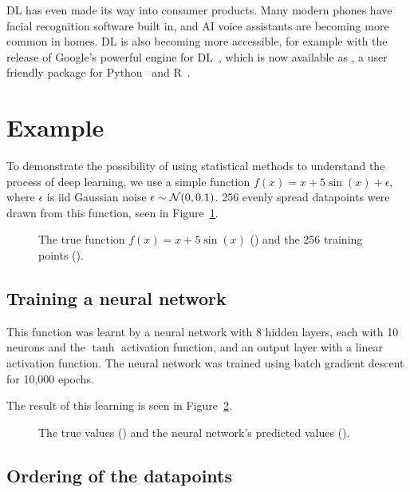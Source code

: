 \ac{DL} has even made its way into consumer products.
Many modern phones have facial recognition software built in, and \ac{AI} voice assistants are becoming more common in homes.
\ac{DL} is also becoming more accessible, for example with the release of Google's powerful  engine for \ac{DL}~\autocite{abadi2016}, which is now available as , a user friendly package for Python~\autocite{chollet2015} and R~\autocite{allaire2018}.

\section{Example}

To demonstrate the possibility of using statistical methods to understand the process of deep learning, we use a simple function \(f(x) = x + 5 \sin(x) + \epsilon\), where \(\epsilon\) is iid Gaussian noise \(\epsilon \sim \mathcal{N}(0, 0.1)\).
256 evenly spread datapoints were drawn from this function, seen in Figure~\ref{fig:sin-x-dataset}.

\begin{figure}[htbp]
	\centering
	
	\caption{The true function \(f(x) = x + 5 \sin(x)\) (\truthcolour) and the 256 training points (\traincolour).}
	\label{fig:sin-x-dataset}
\end{figure}

\subsection{Training a neural network}

This function was learnt by a neural network with 8 hidden layers, each with 10 neurons and the \(\tanh\) activation function, and an output layer with a linear activation function.
The neural network was trained using batch gradient descent for 10,000 epochs.

The result of this learning is seen in Figure~\ref{fig:ann-preds}.

\begin{figure}[htbp]
	\centering
	
	\caption{The true values (\truthcolour) and the neural network's predicted values (\anncolour).}
	\label{fig:ann-preds}
\end{figure}

\subsection{Ordering of the datapoints}


